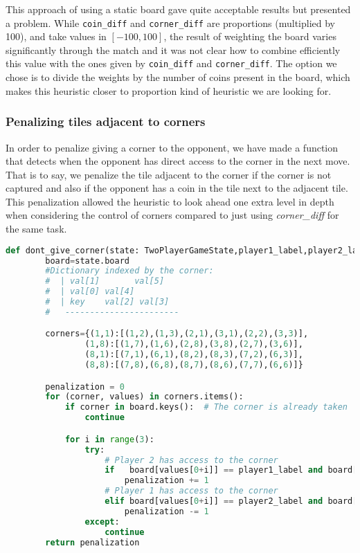\documentclass{article}
\begin{document}
This approach of using a static board gave quite acceptable results but presented a problem. While \texttt{coin\_diff} and \texttt{corner\_diff} are proportions (multiplied by 100), and take values in $[-100,100]$, the result of weighting the board varies significantly through the match and it was not clear how to combine efficiently this value with the ones given by \texttt{coin\_diff} and \texttt{corner\_diff}. The option we chose is to divide the weights by the number of coins present in the board, which makes this heuristic closer to proportion kind of heuristic we are looking for.


\subsubsection{Penalizing tiles adjacent to corners}

In order to penalize giving a corner to the opponent, we have made a function that detects when the opponent has direct access to the corner in the next move. That is to say, we penalize the tile adjacent to the corner if the corner is not captured and also if the opponent has a coin in the tile next to the adjacent tile. This penalization allowed the heuristic to look ahead one extra level in depth when considering the control of corners compared to just using \textit{corner\_diff} for the same task. 


\begin{lstlisting}[language=python, caption = Penalize giving corners,captionpos=t]
    def dont_give_corner(state: TwoPlayerGameState,player1_label,player2_label) -> float:
        board=state.board
        #Dictionary indexed by the corner:
        #  | val[1]       val[5]
        #  | val[0] val[4]
        #  | key    val[2] val[3]
        #   -----------------------

        corners={(1,1):[(1,2),(1,3),(2,1),(3,1),(2,2),(3,3)],
                (1,8):[(1,7),(1,6),(2,8),(3,8),(2,7),(3,6)],
                (8,1):[(7,1),(6,1),(8,2),(8,3),(7,2),(6,3)],
                (8,8):[(7,8),(6,8),(8,7),(8,6),(7,7),(6,6)]}

        penalization = 0
        for (corner, values) in corners.items():
            if corner in board.keys():  # The corner is already taken
                continue

            for i in range(3):
                try:
                    # Player 2 has access to the corner
                    if   board[values[0+i]] == player1_label and board[values[1+i]] == player2_label:
                        penalization += 1
                    # Player 1 has access to the corner
                    elif board[values[0+i]] == player2_label and board[values[1+i]] == player1_label:
                        penalization -= 1
                except:
                    continue
        return penalization

\end{lstlisting}
\end{document}
